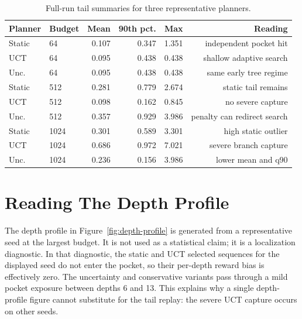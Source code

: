 \documentclass{article}
\begin{document}
\begin{table}[htbp]
\caption{Full-run tail summaries for three representative planners.}
\label{tab:budget-tail}
\begin{center}
\small
\begin{tabular}{llrrrr}
\toprule
Planner & Budget & Mean & 90th pct. & Max & Reading \\
\midrule
Static & 64 & 0.107 & 0.347 & 1.351 & independent pocket hit \\
UCT & 64 & 0.095 & 0.438 & 0.438 & shallow adaptive search \\
Unc. & 64 & 0.095 & 0.438 & 0.438 & same early tree regime \\
Static & 512 & 0.281 & 0.779 & 2.674 & static tail remains \\
UCT & 512 & 0.098 & 0.162 & 0.845 & no severe capture \\
Unc. & 512 & 0.357 & 0.929 & 3.986 & penalty can redirect search \\
Static & 1024 & 0.301 & 0.589 & 3.301 & high static outlier \\
UCT & 1024 & 0.686 & 0.972 & 7.021 & severe branch capture \\
Unc. & 1024 & 0.236 & 0.156 & 3.986 & lower mean and q90 \\
\bottomrule
\end{tabular}
\end{center}
\end{table}

\section{Reading The Depth Profile}

The depth profile in Figure~\ref{fig:depth-profile} is generated from a representative seed at the largest budget. It is not used as a statistical claim; it is a localization diagnostic. In that diagnostic, the static and UCT selected sequences for the displayed seed do not enter the pocket, so their per-depth reward bias is effectively zero. The uncertainty and conservative variants pass through a mild pocket exposure between depths 6 and 13. This explains why a single depth-profile figure cannot substitute for the tail replay: the severe UCT capture occurs on other seeds.
\end{document}
